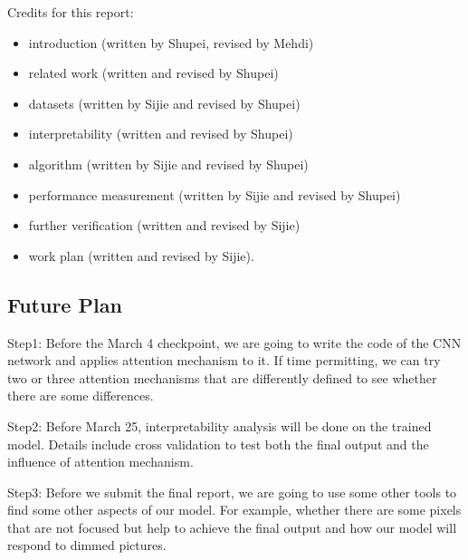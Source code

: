 \documentclass[12pt]{article}
\begin{document}
Credits for this report:
\begin{itemize}
    \item introduction (written by Shupei, revised by Mehdi)
    \item related work (written and revised by Shupei)
    \item datasets (written by Sijie and revised by Shupei)
    \item interpretability (written and revised by Shupei)
    \item algorithm (written by Sijie and revised by Shupei)
    \item performance measurement (written by Sijie and revised by Shupei)
    \item further verification (written and revised by Sijie)
    \item work plan (written and revised by Sijie).
\end{itemize}

\subsection{Future Plan}
Step1: Before the March 4 checkpoint, we are going to write the code of the CNN network and applies attention mechanism to it. 
If time permitting, we can try two or three attention mechanisms that are differently defined to see whether there are some differences. 

Step2: Before March 25, interpretability analysis will be done on the trained model. Details include cross validation to test both the final output and the influence of attention mechanism. 

Step3: Before we submit the final report, we are going to use some other tools to find some other aspects of our model. 
For example, whether there are some pixels that are not focused but help to achieve the final output and how our model will respond to dimmed pictures. 

\newpage



\end{document}
